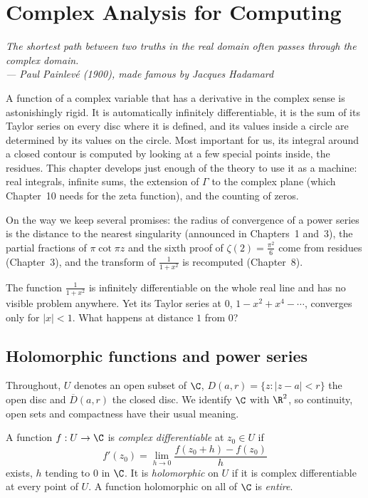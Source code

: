 \chapter{Complex Analysis for Computing}

\begin{center}\itshape
The shortest path between two truths in the real domain often passes through the complex domain.\\
\upshape --- Paul Painlev\'e (1900), made famous by Jacques Hadamard
\end{center}

A function of a complex variable that has a derivative in the complex sense is astonishingly rigid. It is automatically
infinitely differentiable, it is the sum of its Taylor series on every disc where it is defined, and its values inside a
circle are determined by its values on the circle. Most important for us, its integral around a closed contour is
computed by looking at a few special points inside, the residues. This chapter develops just enough of the theory to use
it as a machine: real integrals, infinite sums, the extension of $\Gamma$ to the complex plane (which Chapter~10 needs for
the zeta function), and the counting of zeros.

On the way we keep several promises: the radius of convergence of a power series is the distance to the nearest
singularity (announced in Chapters~1 and~3), the partial fractions of $\pi\cot\pi z$ and the sixth proof of
$\zeta(2)=\frac{\pi^2}6$ come from residues (Chapter~3), and the transform of $\frac1{1+x^2}$ is recomputed (Chapter~8).

\begin{think}
The function $\frac1{1+x^2}$ is infinitely differentiable on the whole real line and has no visible problem anywhere. Yet its
Taylor series at $0$, $1-x^2+x^4-\cdots$, converges only for $|x|<1$. What happens at distance $1$ from $0$?
\end{think}

\section{Holomorphic functions and power series}

Throughout, $U$ denotes an open subset of $\C$, $D(a,r)=\{z:|z-a|<r\}$ the open disc and $\overline D(a,r)$ the closed disc. We
identify $\C$ with $\R^2$, so continuity, open sets and compactness have their usual meaning.

\begin{definition}
A function $f:U\to\C$ is \emph{complex differentiable} at $z_0\in U$ if
\[
f'(z_0)=\lim_{h\to0}\frac{f(z_0+h)-f(z_0)}h
\]
exists, $h$ tending to $0$ in $\C$. It is \emph{holomorphic} on $U$ if it is complex differentiable at every point of $U$. A
function holomorphic on all of $\C$ is \emph{entire}.
\end{definition}

